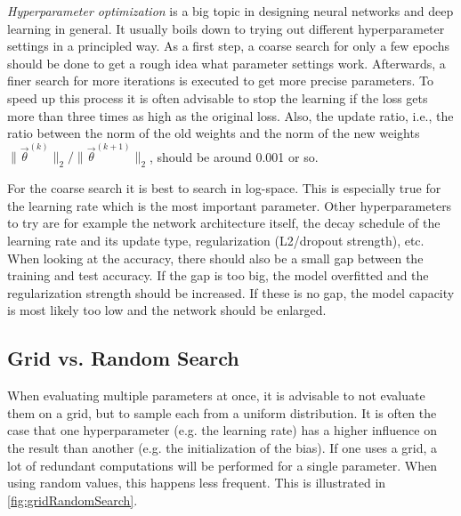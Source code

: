 		\emph{Hyperparameter optimization} is a big topic in designing neural networks and deep learning in general. It usually boils down to trying out different hyperparameter settings in a principled way. As a first step, a coarse search for only a few epochs should be done to get a rough idea what parameter settings work. Afterwards, a finer search for more iterations is executed to get more precise parameters. To speed up this process it is often advisable to stop the learning if the loss gets more than three times as high as the original loss. Also, the update ratio, i.e., the ratio between the norm of the old weights and the norm of the new weights \( \lVert \vec{\theta}^{(k)} \rVert_2 / \lVert \vec{\theta}^{(k + 1)} \rVert_2 \), should be around \num{0.001} or so.

		For the coarse search it is best to search in log-space. This is especially true for the learning rate which is the most important parameter. Other hyperparameters to try are for example the network architecture itself, the decay schedule of the learning rate and its update type, regularization (L2/dropout strength), etc. When looking at the accuracy, there should also be a small gap between the training and test accuracy. If the gap is too big, the model overfitted and the regularization strength should be increased. If these is no gap, the model capacity is most likely too low and the network should be enlarged.

		\subsection{Grid vs. Random Search}
			When evaluating multiple parameters at once, it is advisable to not evaluate them on a grid, but to sample each from a uniform distribution. It is often the case that one hyperparameter (e.g. the learning rate) has a higher influence on the result than another (e.g. the initialization of the bias). If one uses a grid, a lot of redundant computations will be performed for a single parameter. When using random values, this happens less frequent. This is illustrated in \autoref{fig:gridRandomSearch}.

